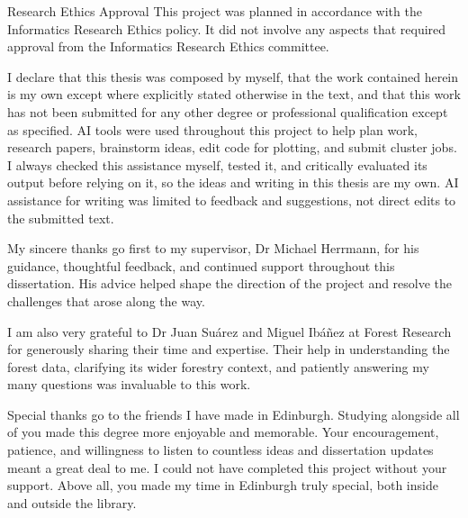\documentclass[logo,msc,ai]{infthesis}           %
\begin{document}
\begin{preliminary}
\newenvironment{ethics}
   {\begin{frontenv}{Research Ethics Approval}{\LARGE}}
   {\end{frontenv}\newpage}

\begin{ethics}
This project was planned in accordance with the Informatics Research
Ethics policy. It did not involve any aspects that required approval
from the Informatics Research Ethics committee.

I declare that this thesis was composed by myself, that the work contained herein is my own except where explicitly stated otherwise in the text, and that this work has not been submitted for any other degree or professional qualification except as specified. AI tools were used throughout this project to help plan work, research papers, brainstorm ideas, edit code for plotting, and submit cluster jobs. I always checked this assistance myself, tested it, and critically evaluated its output before relying on it, so the ideas and writing in this thesis are my own. AI assistance for writing was limited to feedback and suggestions, not direct edits to the submitted text.
\end{ethics}


\begin{acknowledgements}
My sincere thanks go first to my supervisor, Dr Michael Herrmann, for his guidance, thoughtful feedback, and continued support throughout this dissertation. His advice helped shape the direction of the project and resolve the challenges that arose along the way.

I am also very grateful to Dr Juan Suárez and Miguel Ibáñez at Forest Research for generously sharing their time and expertise. Their help in understanding the forest data, clarifying its wider forestry context, and patiently answering my many questions was invaluable to this work.

Special thanks go to the friends I have made in Edinburgh. Studying alongside all of you made this degree more enjoyable and memorable. Your encouragement, patience, and willingness to listen to countless ideas and dissertation updates meant a great deal to me. I could not have completed this project without your support. Above all, you made my time in Edinburgh truly special, both inside and outside the library.


\end{acknowledgements}
\end{preliminary}
\end{document}
